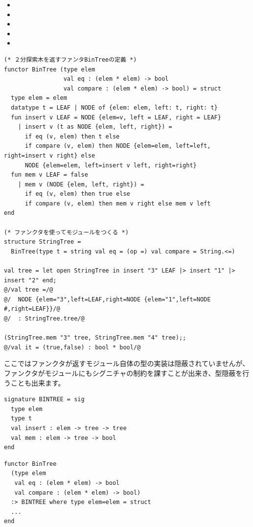 \documentclass[11pt,a4paper]{article}
\begin{document}
\begin{itemize}
\item {}
\item {}
\item {}
\item {}
\item {}
\end{itemize}
\begin{lstlisting}[caption=ファンクタの例]
(* ２分探索木を返すファンタBinTreeの定義 *)
functor BinTree (type elem
                 val eq : (elem * elem) -> bool
                 val compare : (elem * elem) -> bool) = struct
  type elem = elem
  datatype t = LEAF | NODE of {elem: elem, left: t, right: t}
  fun insert v LEAF = NODE {elem=v, left = LEAF, right = LEAF}
    | insert v (t as NODE {elem, left, right}) =
      if eq (v, elem) then t else
      if compare (v, elem) then NODE {elem=elem, left=left, right=insert v right} else
      NODE {elem=elem, left=insert v left, right=right}
  fun mem v LEAF = false
    | mem v (NODE {elem, left, right}) =
      if eq (v, elem) then true else
      if compare (v, elem) then mem v right else mem v left
end

(* ファンクタを使ってモジュールをつくる *)
structure StringTree =
  BinTree(type t = string val eq = (op =) val compare = String.<=)

val tree = let open StringTree in insert "3" LEAF |> insert "1" |> insert "2" end;
@/val tree =/@
@/  NODE {elem="3",left=LEAF,right=NODE {elem="1",left=NODE #,right=LEAF}}/@
@/  : StringTree.tree/@

(StringTree.mem "3" tree, StringTree.mem "4" tree);;
@/val it = (true,false) : bool * bool/@
\end{lstlisting}

ここではファンクタが返すモジュール自体の型の実装は隠蔽されていませんが、
ファンクタがモジュールにもシグニチャの制約を課すことが出来き、型隠蔽を行うことも出来ます。

\begin{minipage}[htb]{0.45\textwidth}
\begin{lstlisting}[caption=２分木のシグニチャ]
signature BINTREE = sig
  type elem
  type t
  val insert : elem -> tree -> tree
  val mem : elem -> tree -> bool
end
\end{lstlisting}
\end{minipage}
\hfill
\begin{minipage}[htb]{0.55\textwidth}
\begin{lstlisting}[caption=BinTreeの再定義,label=code:bin-tree-with-sig]
functor BinTree
  (type elem
   val eq : (elem * elem) -> bool
   val compare : (elem * elem) -> bool)
  :> BINTREE where type elem=elem = struct
  ...
end
\end{lstlisting}
\end{minipage}
\end{document}
